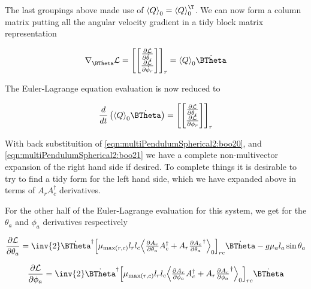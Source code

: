 The last groupings above made use of $\gpgradezero{Q} = \gpgradezero{Q}^\T$.  We can now form a column matrix putting all the angular velocity gradient in a tidy block matrix representation

\begin{align}\label{eqn:multiPendulumSpherical2:boo22}
\grad_{\dot{\BTheta}} \LL = 
{\begin{bmatrix}
\begin{bmatrix}
\PD{\dot{\theta}_r}{\LL} \\
\PD{\dot{\phi}_r}{\LL} \\
\end{bmatrix}
\end{bmatrix}}_r = \gpgradezero{Q} \dot{\BTheta}
\end{align}

The Euler-Lagrange equation evaluation is now reduced to

\begin{align}\label{eqn:multiPendulumSpherical2:boo23}
\frac{d}{dt} \left( \gpgradezero{Q} \dot{\BTheta} \right) =
{\begin{bmatrix}
\begin{bmatrix}
\PD{\theta_r}{\LL} \\
\PD{\phi_r}{\LL} \\
\end{bmatrix}
\end{bmatrix}}_r
\end{align}

With back substituition of \ref{eqn:multiPendulumSpherical2:boo20}, and \ref{eqn:multiPendulumSpherical2:boo21} we have a complete non-multivector expansion of the right hand side if desired.  To complete things it is desirable to try to find a tidy form for the left hand side, which we have expanded above in terms of $A_r A_c^\dagger$ derivatives.

For the other half of the Euler-Lagrange evaluation for this system, we get for the $\theta_a$ and $\phi_a$ derivatives respectively

\begin{align}\label{eqn:multiPendulumSpherical2:boo6}
\PD{\theta_a}{\LL}
=
\inv{2} \dot{\BTheta}^\dagger
{\begin{bmatrix}
\mu_{\max(r,c)} l_r l_c \gpgradezero{
\PD{\theta_a}{A_r} A_c^\dagger
+A_r \PD{\theta_a}{A_c}^\dagger
}
\end{bmatrix}}_{rc} 
\dot{\BTheta}
-g \mu_a l_a \sin\theta_a 
\end{align}

\begin{align}\label{eqn:multiPendulumSpherical2:boo6c}
\PD{\phi_a}{\LL}
=
\inv{2} \dot{\BTheta}^\dagger
{\begin{bmatrix}
\mu_{\max(r,c)} l_r l_c \gpgradezero{
\PD{\phi_a}{A_r} A_c^\dagger
+A_r \PD{\phi_a}{A_c}^\dagger
}
\end{bmatrix}}_{rc} 
\dot{\BTheta}
\end{align}

